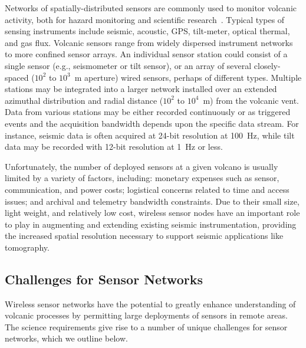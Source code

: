Networks of spatially-distributed sensors are commonly used to monitor
volcanic activity, both for hazard monitoring and scientific
research~\cite{Scarpa96}. Typical types of sensing instruments include
seismic, acoustic, GPS, tilt-meter, optical thermal, and gas flux. Volcanic
sensors range from widely dispersed instrument networks to more confined
sensor arrays. An individual sensor station could consist of a single sensor
(e.g., seismometer or tilt sensor), or an array of several closely-spaced
($10^2$ to $10^3$~m aperture) wired sensors, perhaps of different types.
Multiple stations may be integrated into a larger network installed over an
extended azimuthal distribution and radial distance ($10^2$ to $10^4$~m) from
the volcanic vent. Data from various stations may be either recorded
continuously or as triggered events and the acquisition bandwidth depends
upon the specific data stream. For instance, seismic data is often acquired
at 24-bit resolution at 100~Hz, while tilt data may be recorded with 12-bit
resolution at 1~Hz or less.

Unfortunately, the number of deployed sensors at a given volcano is usually
limited by a variety of factors, including: monetary expenses such as sensor,
communication, and power costs; logistical concerns related to time and
access issues; and archival and telemetry bandwidth constraints. Due to their
small size, light weight, and relatively low cost, wireless sensor nodes have
an important role to play in augmenting and extending existing seismic
instrumentation, providing the increased spatial resolution necessary to
support seismic applications like tomography.

\subsection{Challenges for Sensor Networks}


Wireless sensor networks have the potential to greatly enhance understanding
of volcanic processes by permitting large deployments of sensors in remote
areas. The science requirements give rise to a number of unique challenges
for sensor networks, which we outline below.

